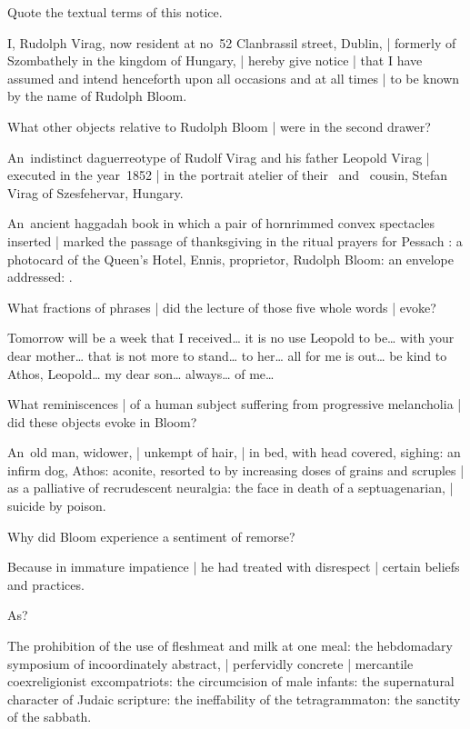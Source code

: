 Quote the textual terms of this notice.

\Factual[~(legal)]
I, Rudolph Virag, now resident at no~52 Clanbrassil street, Dublin, |
formerly of Szombathely in the kingdom of Hungary, |
hereby give notice |
that I have assumed and intend henceforth upon all occasions
and at all times |
to be known by the name of Rudolph Bloom.


What other objects relative to Rudolph Bloom
 |
were in the second drawer?

\Household
An~indistinct daguerreotype of Rudolf Virag and his father Leopold Virag |
executed in the year~1852 |
in the portrait atelier of their
~and ~cousin,
Stefan Virag of Szesfehervar, Hungary.

\Memories
An~ancient haggadah book
in which a pair of hornrimmed convex spectacles inserted |
marked the passage of thanksgiving in the ritual prayers for Pessach
:
a photocard of the Queen's Hotel, Ennis, proprietor, Rudolph Bloom:
an envelope addressed:
.


What fractions of phrases |
did the lecture of those five whole words |
evoke?

\Poetry[~(emotion)]
Tomorrow will be a week that I received…
it is no use Leopold to be…
with your dear mother…
that is not more to stand…
to her…
all for me is out…
be kind to Athos, Leopold…
my dear son…
always…
of me…


What reminiscences |
of a human subject suffering from progressive melancholia |
did these objects evoke in Bloom?

\Poetry[~(emotion)]
An~old man, widower, |
unkempt of hair, |
in bed, with head covered, sighing:
an infirm dog, Athos:
aconite, resorted to by increasing doses of grains and scruples |
as a palliative of recrudescent neuralgia:
the face in death of a septuagenarian, |
suicide by poison.


Why did Bloom experience a sentiment of remorse?

\Bloom
Because in immature impatience |
he had treated with disrespect |
certain beliefs and practices.


As?

\Religious
The prohibition of the use of fleshmeat and milk at one meal:
the hebdomadary symposium of incoordinately abstract, |
perfervidly concrete |
mercantile coexreligionist excompatriots:
the circumcision of male infants:
the supernatural character of Judaic scripture:
the ineffability of the tetragrammaton:
the sanctity of the sabbath.


